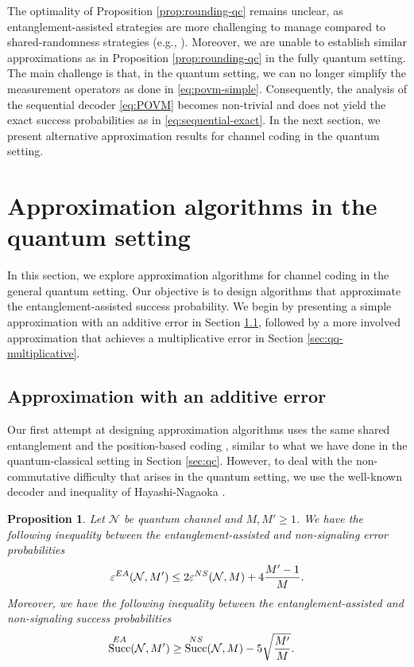 \documentclass[a4paper,onecolumn,11pt,accepted=2025-10-01]{quantumarticle}
\newtheorem{prop}[theorem]{Proposition}
\DeclareMathOperator{\suc}{Succ}
\newcommand*{\cN}{\mathcal{N}}
\newcommand*{\eps}{\varepsilon}
\begin{document}
The optimality of Proposition \ref{prop:rounding-qc} remains unclear, as entanglement-assisted  strategies are more challenging to manage compared to shared-randomness strategies (e.g., \cite{Pironio2010May,Berta2016Aug,berta2024optimality}). Moreover, we are unable to establish similar approximations as in Proposition \ref{prop:rounding-qc} in the fully quantum setting. The main challenge is that, in the quantum setting, we can no longer simplify the measurement operators as done in \eqref{eq:povm-simple}. Consequently, the analysis of the sequential decoder \eqref{eq:POVM} becomes non-trivial and does not yield the exact success probabilities as in \eqref{eq:sequential-exact}. In the next section, we present  alternative approximation results for channel coding in the quantum setting.


\section{Approximation algorithms in the quantum setting}
\label{sec:qq}

In this section, we explore approximation algorithms for channel coding in the general quantum setting. Our objective is to design algorithms that approximate  the entanglement-assisted  success probability. We begin by presenting  a simple approximation with an additive error in Section \ref{sec:qq-additive}, followed by a more involved approximation that achieves a multiplicative error in Section \ref{sec:qq-multiplicative}. 

\subsection{Approximation with an additive error}\label{sec:qq-additive}


Our first attempt at designing approximation algorithms uses the same shared entanglement and the position-based coding \cite{Anshu2018Jun,qi18}, similar to what we have done in the quantum-classical setting in Section \ref{sec:qc}. However, to deal with the non-commutative difficulty that arises in the quantum setting, we use the well-known decoder and inequality of Hayashi-Nagaoka \cite{Hayashi2003Jun}.

\begin{prop}\label{prop:rounding-qq-additive}
Let $\cN$ be quantum channel and $M, M'\ge 1$. We have the following inequality between the entanglement-assisted and non-signaling error probabilities
 \begin{align}
    \eps_{}^{\rm{EA}}(\cN, M')\le 2\eps_{}^{\rm{NS}}(\cN,M) +4\frac{M'-1}{M}.
\end{align}
Moreover, we have the following inequality between the entanglement-assisted and non-signaling success probabilities 
\begin{align}
   \suc_{}^{\rm{EA}}(\cN, M')&\ge   \suc^{\rm{NS}}(\cN,M)  -5 \sqrt{\frac{M'}{M}}. 
\end{align}
\end{prop}
\end{document}
